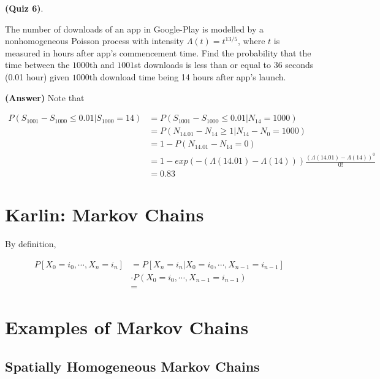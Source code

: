 \documentclass[12pt]{article}
\theoremstyle{nonumberbreak}
\begin{document}
\textbf{(Quiz 6)}. 

The number of downloads of an app in Google-Play is modelled by a nonhomogeneous Poisson process with intensity $\Lambda(t)=t^{13/5}$, where $t$ is measured in hours after app's commencement time. Find the probability that the time between the $1000$th and $1001$st downloads is less than or equal to $36$ seconds (0.01 hour) given $1000$th download time being 14 hours after app's launch.


\textbf{(Answer)} Note that

$$
\begin{aligned}
P(S_{1001} - S_{1000} \le 0.01 | S_{1000} = 14) &= P(S_{1001} - S_{1000} \le 0.01 | N_{14} = 1000) \\[8pt]
&= P( N_{14.01} - N_{14} \ge 1 | N_{14} - N_0 = 1000) \\[8pt]
&= 1- P( N_{14.01} - N_{14} = 0 ) \\[8pt]
&= 1- exp(-(\Lambda(14.01) - \Lambda(14)) ) \frac{(\Lambda(14.01) - \Lambda(14))^0}{0!} \\[8pt]
&= 0.83
\end{aligned}
$$





\pagebreak
\section*{Karlin: Markov Chains}
\setcounter{section}{0}


By definition, 


$$
\begin{aligned}
P\left[ X_0 = i_0, \cdots, X_n = i_n \right] &= P[X_n = i_n | X_0 = i_0, \cdots, X_{n-1} = i_{n-1}] \\[8pt]
&\cdot P(X_0 = i_0, \cdots, X_{n-1} = i_{n-1}) \\[8pt]
&= 
\end{aligned}
$$


\section{Examples of Markov Chains}

\subsection{Spatially Homogeneous Markov Chains}
\end{document}
